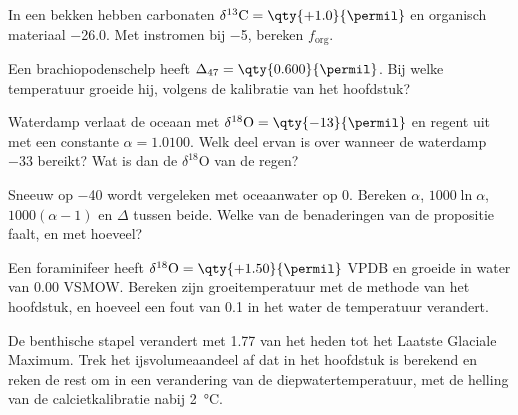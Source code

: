 \begin{exercise}[$\star$]\label{exo:b3:stable-isotopes:3}
In een bekken hebben carbonaten $\delta^{13}\mathrm C = \qty{+1.0}{\permil}$ en organisch
materiaal \qty{-26.0}{\permil}. Met instromen bij \qty{-5}{\permil}, bereken
$f_{\mathrm{org}}$.
\end{exercise}

\begin{exercise}[$\star$]\label{exo:b3:stable-isotopes:4}
Een brachiopodenschelp heeft $\Delta_{47} = \qty{0.600}{\permil}$. Bij welke temperatuur
groeide hij, volgens de kalibratie van het hoofdstuk?
\end{exercise}

\begin{exercise}[$\star\star$]\label{exo:b3:stable-isotopes:5}
Waterdamp verlaat de oceaan met $\delta^{18}\mathrm O = \qty{-13}{\permil}$ en regent
uit met een constante $\alpha = 1.0100$. Welk deel ervan is over wanneer de
waterdamp \qty{-33}{\permil} bereikt? Wat is dan de $\delta^{18}\mathrm O$ van de
regen?
\end{exercise}

\begin{exercise}[$\star\star$]\label{exo:b3:stable-isotopes:6}
Sneeuw op \qty{-40}{\permil} wordt vergeleken met oceaanwater op 0. Bereken $\alpha$,
$1000\ln\alpha$, $1000(\alpha - 1)$ en $\Delta$ tussen beide. Welke van de
benaderingen van de propositie faalt, en met hoeveel?
\end{exercise}

\begin{exercise}[$\star\star$]\label{exo:b3:stable-isotopes:7}
Een foraminifeer heeft $\delta^{18}\mathrm O = \qty{+1.50}{\permil}$ VPDB en groeide in
water van \qty{0.00}{\permil} VSMOW. Bereken zijn groeitemperatuur met de
methode van het hoofdstuk, en hoeveel een fout van \qty{0.1}{\permil} in het water
de temperatuur verandert.
\end{exercise}

\begin{exercise}[$\star\star$]\label{exo:b3:stable-isotopes:8}
De benthische stapel verandert met \qty{1.77}{\permil} van het heden tot het Laatste
Glaciale Maximum. Trek het ijsvolumeaandeel af dat in het hoofdstuk is berekend en
reken de rest om in een verandering van de diepwatertemperatuur, met de helling van de
calcietkalibratie nabij \qty{2}{\celsius}.
\end{exercise}

